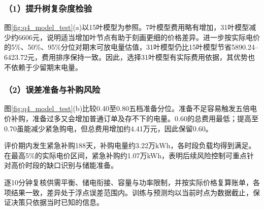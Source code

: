 \subsubsection*{（1）提升树复杂度检验}

图\ref{fig:q4_model_test}(a)以15叶模型为参照。7叶模型费用略有增加，31叶模型减少约6606元，说明适当增加叶节点有助于刻画更细的价格差异。进一步按实际电价的5\%、50\%、95\%分位对期末可放电量估值，31叶模型仍比15叶模型节省5890.24--6423.72元，费用排序保持一致。因此，选择31叶模型有实际费用依据，其优势也不依赖于少留期末电量。

\subsubsection*{（2）误差准备与补购风险}

图\ref{fig:q4_model_test}(b)比较0.40至0.80五档准备分位。准备不足容易触发五倍电价补购，准备过多又会增加普通订单及存不下的电量。0.60的总费用最低；提高至0.70虽能减少紧急购电，但总费用增加约4.41万元，因此保留0.60。

评价期内发生紧急补购188天，补购电量约3.22万$\mathrm{kWh}$，各时段负载均得到满足。在最高5\%的实际电价区间，紧急补购约1.07万kWh，表明后续风险控制可重点针对高价时段的缺口识别与储能准备。

逐10分钟复核供需平衡、储电衔接、容量与功率限制，并按实际价格复算账单，各项结果一致，差异处于浮点误差范围内。训练与预测均以当前时点为数据截止，保证决策只依据当时已知的信息。
